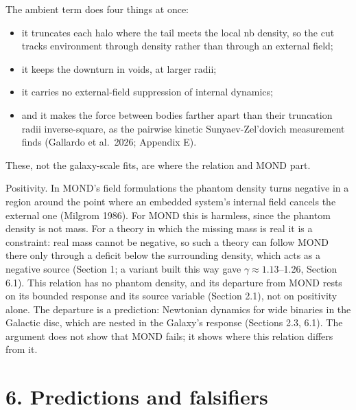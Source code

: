 \documentclass[
  10pt,
]{article}
\begin{document}
The ambient term does four things at once:
\begin{itemize}
\item it truncates each halo where the tail meets the local nb density, so the cut tracks environment through density rather than through an external field;
\item it keeps the downturn in voids, at larger radii;
\item it carries no external-field suppression of internal dynamics;
\item and it makes the force between bodies farther apart than their truncation radii inverse-square, as the pairwise kinetic Sunyaev-Zel'dovich measurement finds (Gallardo et al.~2026; Appendix E).
\end{itemize}
These, not the galaxy-scale fits, are where the
relation and MOND part.

Positivity. In MOND's field formulations the phantom density turns
negative in a region around the point where an embedded system's internal
field cancels the external one (Milgrom 1986). For MOND this is harmless,
since the phantom density is not mass. For a theory in which the missing
mass is real it is a constraint: real mass cannot be negative, so such a
theory can follow MOND there only through a deficit below the surrounding density, which acts as a negative source (Section 1; a variant built this way gave $\gamma\approx1.13$--1.26, Section 6.1). This relation has no phantom density, and its departure from MOND rests on its bounded response and its source variable (Section 2.1), not on positivity alone. The departure is a prediction: Newtonian dynamics for wide
binaries in the Galactic disc, which are nested in the Galaxy's response
(Sections 2.3, 6.1). The argument does not show that
MOND fails; it shows where this relation differs from it.

\section{6. Predictions and falsifiers}\label{predictions-and-falsifiers}
\end{document}
